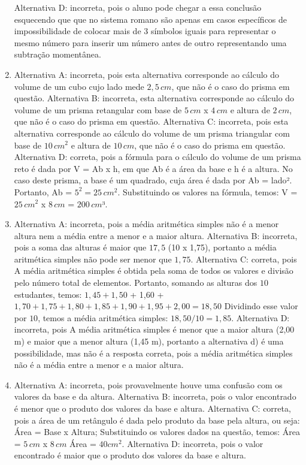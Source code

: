 \begin{enumerate}
Alternativa D: incorreta, pois o aluno pode chegar a essa conclusão
esquecendo que que no sistema romano são apenas em casos específicos de
impossibilidade de colocar mais de $3$ símbolos iguais para representar o
mesmo número para inserir um número antes de outro representando uma
subtração momentânea.
\item Alternativa A: incorreta, pois esta alternativa corresponde ao cálculo
do volume de um cubo cujo lado mede $2,5\,cm$, que não é o caso do prisma
em questão.
Alternativa B: incorreta, esta alternativa corresponde ao cálculo do
volume de um prisma retangular com base de $5\,cm$ x $4\,cm$ e altura de $2\,cm$,
que não é o caso do prisma em questão.
Alternativa C: incorreta, pois esta alternativa corresponde ao cálculo
do volume de um prisma triangular com base de $10\,cm^2$ e altura de $10\,cm$,
que não é o caso do prisma em questão.
Alternativa D: correta, pois a fórmula para o cálculo do volume de um
prisma reto é dada por V = Ab x h, em que Ab é a área da base e h é a
altura. No caso deste prisma, a base é um quadrado, cuja área é dada por
Ab = lado². Portanto, Ab = $5^2 = 25\,cm^2$. Substituindo os valores na
fórmula, temos: V = $25\,cm^2$ x $8\,cm$ = $200\,cm$³.
\item Alternativa A: incorreta, pois a média aritmética simples não é a menor
altura nem a média entre a menor e a maior altura.
Alternativa B: incorreta, pois a soma das alturas é maior que $17,5$ (10 x
1,75), portanto a média aritmética simples não pode ser menor que $1,75$.
Alternativa C: correta, pois A média aritmética simples é obtida pela
soma de todos os valores e divisão pelo número total de elementos.
Portanto, somando as alturas dos $10$ estudantes, temos: $1,45 + 1,50$ +
1,60 + $1,70 + 1,75 + 1,80 + 1,85 + 1,90 + 1,95 + 2,00 = 18,50$ Dividindo
esse valor por $10$, temos a média aritmética simples: $18,50 / 10 = 1,85$.
Alternativa D: incorreta, pois A média aritmética simples é menor que a
maior altura (2,00 m) e maior que a menor altura (1,45 m), portanto a
alternativa d) é uma possibilidade, mas não é a resposta correta, pois a
média aritmética simples não é a média entre a menor e a maior altura.
\item Alternativa A: incorreta, pois provavelmente houve uma confusão com os
valores da base e da altura.
Alternativa B: incorreta, pois o valor encontrado é menor que o produto
dos valores da base e altura.
Alternativa C: correta, pois a área de um retângulo é dada pelo produto
da base pela altura, ou seja: Área = Base x Altura; Substituindo os valores dados na questão, temos: Área = $5\,cm$ x $8\,cm$ Área = $40cm^2$.
Alternativa D: incorreta, pois o valor encontrado é maior que o produto
dos valores da base e altura.
\end{enumerate}

